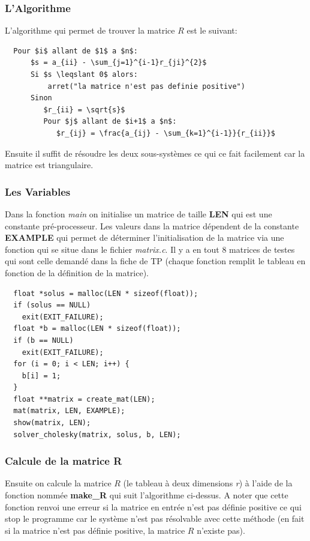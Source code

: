 \documentclass[a4paper]{article}
\begin{document}
\subsubsection{L'Algorithme}

L'algorithme qui permet de trouver la matrice $R$ est le suivant:

\begin{lstlisting}
  Pour $i$ allant de $1$ a $n$:
      $s = a_{ii} - \sum_{j=1}^{i-1}r_{ji}^{2}$
      Si $s \leqslant 0$ alors:
          arret("la matrice n'est pas definie positive")
      Sinon
         $r_{ii} = \sqrt{s}$
         Pour $j$ allant de $i+1$ a $n$:
            $r_{ij} = \frac{a_{ij} - \sum_{k=1}^{i-1}}{r_{ii}}$
\end{lstlisting}

Ensuite il suffit de résoudre les deux sous-systèmes ce qui ce fait facilement
car la matrice est triangulaire.

\subsubsection{Les Variables}

Dans la fonction \textit{main} on initialise un matrice de taille
\textbf{LEN} qui est une constante pré-processeur. Les valeurs dans la matrice
dépendent de la constante \textbf{EXAMPLE} qui permet de déterminer
l’initialisation de la matrice via une fonction qui se situe dans le fichier
\textit{matrix.c}. Il y a en tout 8 matrices de testes qui sont celle demandé
dans la fiche de TP (chaque fonction remplit le tableau en fonction
de la définition de la matrice).

\begin{lstlisting}
  float *solus = malloc(LEN * sizeof(float));
  if (solus == NULL)
    exit(EXIT_FAILURE);
  float *b = malloc(LEN * sizeof(float));
  if (b == NULL)
    exit(EXIT_FAILURE);
  for (i = 0; i < LEN; i++) {
    b[i] = 1;
  }
  float **matrix = create_mat(LEN);
  mat(matrix, LEN, EXAMPLE);
  show(matrix, LEN);
  solver_cholesky(matrix, solus, b, LEN);
\end{lstlisting}

\subsubsection{Calcule de la matrice R}

Ensuite on calcule la matrice $R$ (le tableau à deux dimensions \textit{r}) à
l'aide de la fonction nommée \textbf{make\_R} qui suit l'algorithme ci-dessus. A
noter que cette fonction renvoi une erreur si la matrice en entrée n'est pas
définie positive ce qui stop le programme car le système n'est pas résolvable
avec cette méthode (en fait si la matrice n'est pas définie positive, la matrice
$R$ n'existe pas).
\end{document}
